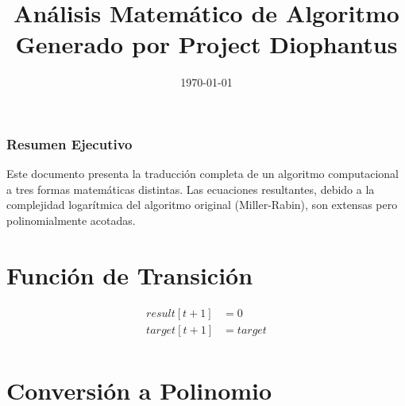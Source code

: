 \documentclass[10pt, a4paper]{article}
\title{Análisis Matemático de Algoritmo \\ \large Generado por Project Diophantus}
\author{}
\date{\today}
\begin{document}
\maketitle
\section*{Resumen Ejecutivo}
Este documento presenta la traducción completa de un algoritmo computacional a tres formas matemáticas distintas.
Las ecuaciones resultantes, debido a la complejidad logarítmica del algoritmo original (Miller-Rabin), son extensas pero polinomialmente acotadas.
\part{Función de Transición}
\begin{align*}
result[t+1] &= 0 \\
target[t+1] &= target \\
\end{align*}\part{Conversión a Polinomio}
\end{document}
